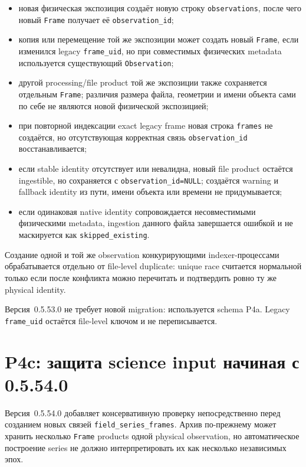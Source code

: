 \begin{itemize}
  \item новая физическая экспозиция создаёт новую строку \texttt{observations}, после чего новый \texttt{Frame} получает её \texttt{observation\_id};
  \item копия или перемещение той же экспозиции может создать новый \texttt{Frame}, если изменился legacy \texttt{frame\_uid}, но при совместимых физических metadata используется существующий \texttt{Observation};
  \item другой processing/file product той же экспозиции также сохраняется отдельным \texttt{Frame}; различия размера файла, геометрии и имени объекта сами по себе не являются новой физической экспозицией;
  \item при повторной индексации exact legacy frame новая строка \texttt{frames} не создаётся, но отсутствующая корректная связь \texttt{observation\_id} восстанавливается;
  \item если stable identity отсутствует или невалидна, новый file product остаётся ingestible, но сохраняется с \texttt{observation\_id=NULL}; создаётся warning и fallback identity из пути, имени объекта или времени не придумывается;
  \item если одинаковая native identity сопровождается несовместимыми физическими metadata, ingestion данного файла завершается ошибкой и не маскируется как \texttt{skipped\_existing}.
\end{itemize}

Создание одной и той же observation конкурирующими indexer-процессами обрабатывается отдельно от file-level duplicate: unique race считается нормальной только если после конфликта можно перечитать и подтвердить ровно ту же physical identity.

Версия~0.5.53.0 не требует новой migration: используется schema P4a. Legacy \texttt{frame\_uid} остаётся file-level ключом и не переписывается.

\section{P4c: защита science input начиная с 0.5.54.0}

Версия~0.5.54.0 добавляет консервативную проверку непосредственно перед созданием новых связей \texttt{field\_series\_frames}. Архив по-прежнему может хранить несколько \texttt{Frame} products одной physical observation, но автоматическое построение series не должно интерпретировать их как несколько независимых эпох.

